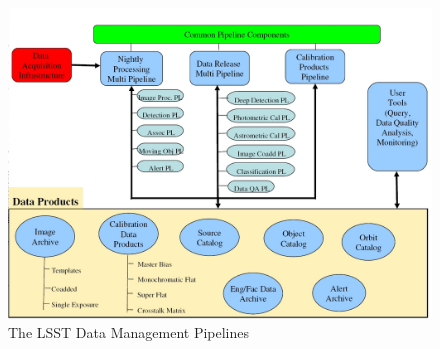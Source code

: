 \begin{figure}[htbp]
\begin{center}
\includegraphics[height=0.45\textheight] {figures/LSSTPipelines}
\caption{The LSST Data Management Pipelines\label{fComp-pipe}}
\end{center}
\end{figure}

